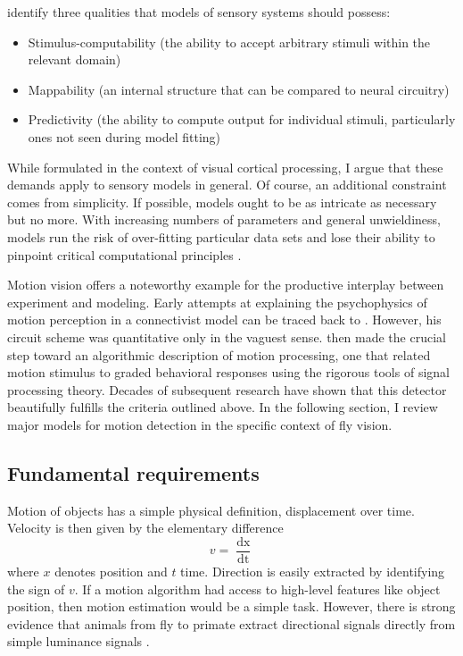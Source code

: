 \citet{Yamins:2016hg} identify three qualities that models of sensory systems should possess:
\begin{itemize}
    \item Stimulus-computability (the ability to accept arbitrary stimuli within the relevant domain)
    \item Mappability (an internal structure that can be compared to neural circuitry)
    \item Predictivity (the ability to compute output for individual stimuli, particularly ones not seen during model fitting)
\end{itemize}
While formulated in the context of visual cortical processing, I argue that these demands apply to sensory models in general. Of course, an additional constraint comes from simplicity. If possible, models ought to be as intricate as necessary but no more. With increasing numbers of parameters and general unwieldiness, models run the risk of over-fitting particular data sets and lose their ability to pinpoint critical computational principles \citep[for an example of a large-scale model of presumably limited explanatory value, see][]{Markram:2015aa}. 

Motion vision offers a noteworthy example for the productive interplay between experiment and modeling. Early attempts at explaining the psychophysics of motion perception in a connectivist model can be traced back to \citet{Exner:1894aa}. However, his circuit scheme was quantitative only in the vaguest sense. \citet{Hassenstein:1956fa} then made the crucial step toward an algorithmic description of motion processing, one that related motion stimulus to graded behavioral responses using the rigorous tools of signal processing theory. Decades of subsequent research have shown that this detector beautifully fulfills the criteria outlined above. In the following section, I review major models for motion detection in the specific context of fly vision.

\subsection{Fundamental requirements}

Motion of objects has a simple physical definition, displacement over time. Velocity is then given by the elementary difference
\begin{equation}
    v = \frac{\mathop{dx}}{\mathop{dt}}
\end{equation}
where $x$ denotes position and $t$ time. Direction is easily extracted by identifying the sign of $v$. If a motion algorithm had access to high-level features like object position, then motion estimation would be a simple task. However, there is strong evidence that animals from fly to primate extract directional signals directly from simple luminance signals \citep{Borst:2011bq,Adelson:1985tx}.

